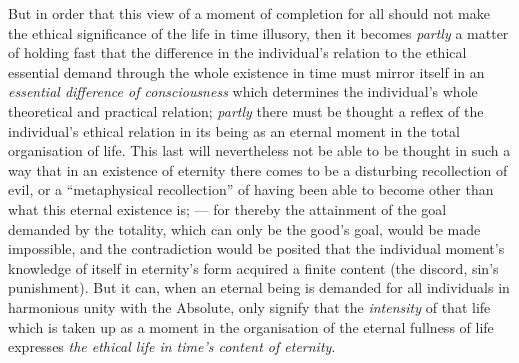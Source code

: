 \documentclass[12pt,a4paper]{book}
\begin{document}
But in order that this view of a moment of completion for all should not make
the ethical significance of the life in time
illusory, then it becomes \emph{partly} a matter of holding fast that the
difference in the individual's relation to the ethical essential demand through
the whole existence in time must mirror itself in an \emph{essential difference
of consciousness} which determines the individual's whole theoretical and
practical relation; \emph{partly} there must be thought a reflex of the
individual's ethical relation in its being as an eternal moment in the total
organisation of life. This last will nevertheless not be able to be thought in
such a way that in an existence of eternity there comes to be a disturbing
recollection of evil, or a ``metaphysical recollection'' of having been able to
become other than what this eternal existence is; --- for thereby the attainment
of the goal demanded by the totality, which can only be the good's goal, would
be made impossible, and the contradiction would be posited that the individual
moment's knowledge of itself in eternity's form acquired a finite content (the
discord, sin's punishment). But it can, when an eternal being is demanded for
all individuals in harmonious unity with the Absolute, only signify that the
\emph{intensity} of that life which is taken up as a moment in the organisation
of the eternal fullness of life expresses \emph{the ethical life in time's
content of eternity}.
\end{document}
